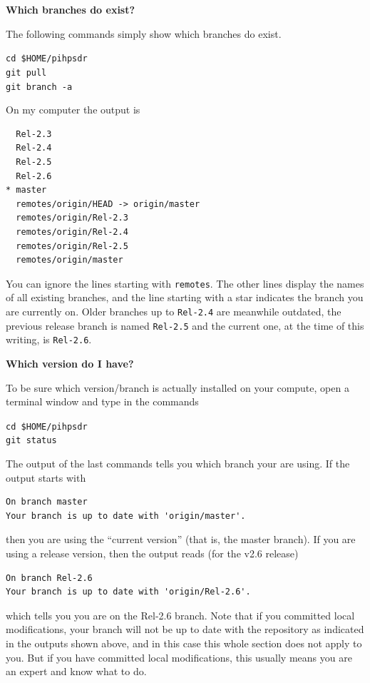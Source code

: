 \documentclass[12pt]{book}
\def\grtt#1{\texttt{\color{magenta}#1}}
\begin{document}
\textbf{Which branches do exist?}

The following commands simply show which branches do exist.

\grtt{cd \$HOME/pihpsdr} \\
\grtt{git pull} \\
\grtt{git branch -a}

On my computer the output is

\begin{verbatim}
  Rel-2.3
  Rel-2.4
  Rel-2.5
  Rel-2.6
* master
  remotes/origin/HEAD -> origin/master
  remotes/origin/Rel-2.3
  remotes/origin/Rel-2.4
  remotes/origin/Rel-2.5
  remotes/origin/master
\end{verbatim}

You can ignore the  lines starting with \texttt{remotes}. The other lines display the names of all
existing branches, and the line starting with a star indicates the branch you are currently on.
Older branches up to \texttt{Rel-2.4} are meanwhile outdated, the previous
release branch is named \texttt{Rel-2.5} and the current one, at the time of this writing, is \texttt{Rel-2.6}.

\medskip
\textbf{Which version do I have?}

To be sure which version/branch is actually installed on your compute, open a terminal  window and
type in the commands

\grtt{cd \$HOME/pihpsdr} \\
\grtt{git status}

The output of the last commands tells you which branch your are using. If the output starts
with

\begin{verbatim}
On branch master
Your branch is up to date with 'origin/master'.
\end{verbatim}

then you are using the ``current version'' (that is, the master branch). If you are using a release
version, then the output reads (for the v2.6 release)

\begin{verbatim}
On branch Rel-2.6
Your branch is up to date with 'origin/Rel-2.6'.
\end{verbatim}

which tells you you are on the Rel-2.6 branch. Note that if you committed local modifications,
your branch will not be up to date with the repository as indicated in the outputs shown above,
and in this case this whole section does  not apply  to you. But if you have committed  local
modifications, this usually means you are an expert and know what to do.
\end{document}
